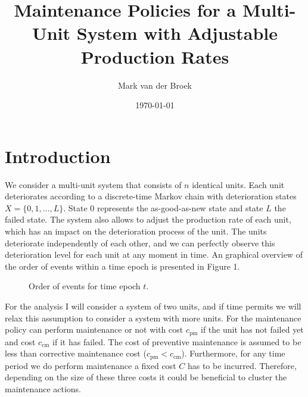 \documentclass[a4paper,11pt]{article}
\title{Maintenance Policies for a Multi-Unit System with Adjustable Production Rates}
\author{Mark van der Broek}
\date{\today}
\begin{document}
	
	\maketitle

\section{Introduction}	
We consider a multi-unit system that consists of $n$ identical units. Each unit deteriorates according to a discrete-time Markov chain with deterioration states $X = \{0, 1, \dots, L\}$. State $0$ represents the as-good-as-new state and state $L$ the failed state. The system also allows to adjust the production rate of each unit, which has an impact on the deterioration process of the unit. The units deteriorate independently of each other, and we can perfectly observe this deterioration level for each unit at any moment in time. An graphical overview of the order of events within a time epoch is presented in Figure 1.

\begin{figure}[H]
	\centering
	\caption{Order of events for time epoch $t$.}
\end{figure}


For the analysis I will consider a system of two units, and if time permits we will relax this assumption to consider a system with more units. For the maintenance policy can perform maintenance or not with cost $c_\text{pm}$ if the unit has not failed yet and cost $c_\text{cm}$ if it has failed. The cost of preventive maintenance is assumed to be less than corrective maintenance cost ($c_\text{pm} < c_\text{cm}$). Furthermore, for any time period we do perform maintenance a fixed cost $C$ has to be incurred. Therefore, depending on the size of these three costs it could be beneficial to cluster the maintenance actions.
\end{document}
